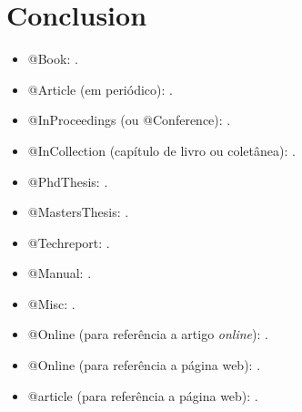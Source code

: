 \documentclass[portuguese,notblind]{sbc20}
\begin{document}
\section{Conclusion}

\begin{itemize}
  \item @Book: \cite{Knuth:96}.

  \item @Article (em periódico): \cite{floats2014}.

  \item @InProceedings (ou @Conference): \cite{alves03:simi}.

  \item @InCollection (capítulo de livro ou coletânea): \cite{bobaoglu93:concepts}.

  \item @PhdThesis: \cite{garcia01:PhD}.

  \item @MastersThesis: \cite{schmidt03:MSc}.

  \item @Techreport: \cite{alvisi99:analysisCIC}.

  \item @Manual: \cite{biblatex}.

  \item @Misc: \cite{gridftp}.

  \item @Online (para referência a artigo \emph{online}): \cite{fowler04:designDead}.

  \item @Online (para referência a página web): \cite{FSF:GNU-GPL}.

  \item @article (para referência a página web): \cite{alon09:how}.
  
\end{itemize}


\SBCprintbibliography
\end{document}
